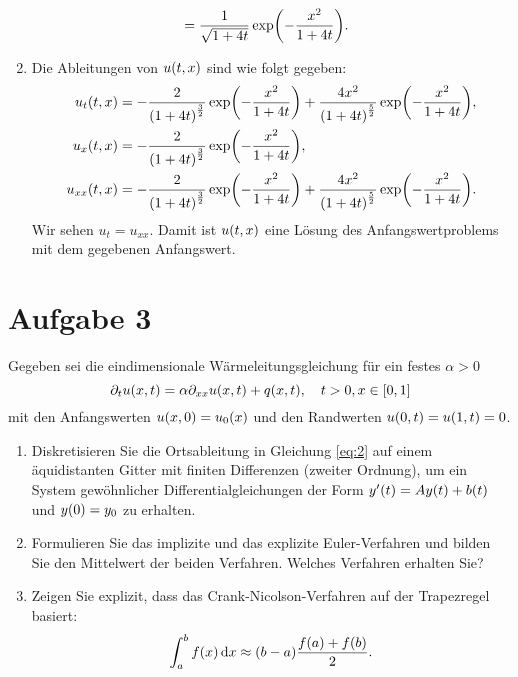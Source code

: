 \documentclass{exercise}
\begin{document}
\begin{enumerate}
\begin{align*}
            &= \frac{1}{\sqrt{1 + 4t}}\exp\parentheses*{-\frac{x^2}{1 + 4t}}.
        \end{align*}
        \item Die Ableitungen von \(u\parentheses*{t, x}\) sind wie folgt gegeben:
        \begin{align*}
            u_t\parentheses*{t, x} &= -\frac{2}{\parentheses*{1 + 4t}^{\frac{3}{2}}}\exp\parentheses*{-\frac{x^2}{1 + 4t}} + \frac{4x^2}{\parentheses*{1 + 4t}^{\frac{5}{2}}}\exp\parentheses*{-\frac{x^2}{1 + 4t}},\\
            u_x\parentheses*{t, x} &= -\frac{2}{\parentheses*{1 + 4t}^{\frac{3}{2}}}\exp\parentheses*{-\frac{x^2}{1 + 4t}},\\
            u_{xx}\parentheses*{t, x} &= -\frac{2}{\parentheses*{1 + 4t}^{\frac{3}{2}}}\exp\parentheses*{-\frac{x^2}{1 + 4t}} + \frac{4x^2}{\parentheses*{1 + 4t}^{\frac{5}{2}}}\exp\parentheses*{-\frac{x^2}{1 + 4t}}.
        \end{align*}
        Wir sehen \(u_t = u_{xx}\).
        Damit ist \(u\parentheses*{t, x}\) eine Lösung des Anfangswertproblems mit dem gegebenen Anfangswert.
    \end{enumerate}


    \section*{Aufgabe 3}
    
    \begin{problem}
        Gegeben sei die eindimensionale Wärmeleitungsgleichung für ein festes \(\alpha > 0\)
        \begin{equation}\label{eq:2}
            \partial_t u\parentheses*{x, t} = \alpha\partial_{xx}u\parentheses*{x, t} + q\parentheses*{x, t}, \quad t > 0, x \in \brackets*{0, 1}
        \end{equation}
        mit den Anfangswerten \(u\parentheses*{x, 0} = u_0\parentheses*{x}\) und den Randwerten \(u\parentheses*{0, t} = u\parentheses*{1, t} = 0\).
        \begin{enumerate}
            \item Diskretisieren Sie die Ortsableitung in Gleichung \eqref{eq:2} auf einem äquidistanten Gitter mit finiten Differenzen (zweiter Ordnung), um ein System gewöhnlicher Differentialgleichungen der Form \(y'\parentheses*{t} = Ay\parentheses*{t} + b\parentheses*{t}\) und \(y\parentheses*{0} = y_0\) zu erhalten.
            \item Formulieren Sie das implizite und das explizite Euler-Verfahren und bilden Sie den Mittelwert der beiden Verfahren.
            Welches Verfahren erhalten Sie?
            \item Zeigen Sie explizit, dass das Crank-Nicolson-Verfahren auf der Trapezregel basiert:
            \[
                \int_a^b f\parentheses*{x}\d x \approx \parentheses*{b - a}\frac{f\parentheses*{a} + f\parentheses*{b}}{2}.
            \]
        \end{enumerate}
    \end{problem}
    
\end{document}
